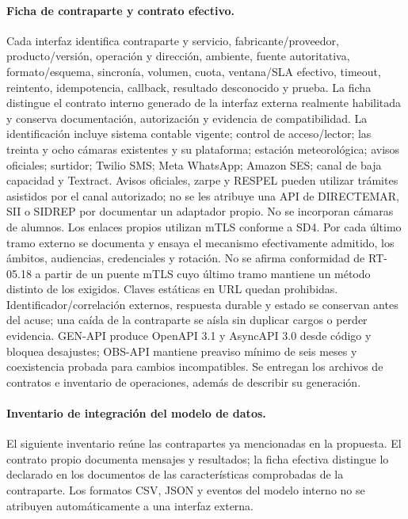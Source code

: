 \paragraph{Ficha de contraparte y contrato efectivo.}
Cada interfaz identifica contraparte y servicio, fabricante/proveedor, producto/versión, operación y dirección, ambiente, fuente autoritativa, formato/esquema, sincronía, volumen, cuota, ventana/SLA efectivo, timeout, reintento, idempotencia, callback, resultado desconocido y prueba. La ficha distingue el contrato interno generado de la interfaz externa realmente habilitada y conserva documentación, autorización y evidencia de compatibilidad.
La identificación incluye sistema contable vigente; control de acceso/lector; las treinta y ocho cámaras existentes y su plataforma; estación meteorológica; avisos oficiales; surtidor; Twilio SMS; Meta WhatsApp; Amazon SES; canal de baja capacidad y Textract. Avisos oficiales, zarpe y RESPEL pueden utilizar trámites asistidos por el canal autorizado; no se les atribuye una API de DIRECTEMAR, SII o SIDREP por documentar un adaptador propio. No se incorporan cámaras de alumnos.
Los enlaces propios utilizan mTLS conforme a SD4. Por cada último tramo externo se documenta y ensaya el mecanismo efectivamente admitido, los ámbitos, audiencias, credenciales y rotación. No se afirma conformidad de RT-05.18 a partir de un puente mTLS cuyo último tramo mantiene un método distinto de los exigidos. Claves estáticas en URL quedan prohibidas. Identificador/correlación externos, respuesta durable y estado se conservan antes del acuse; una caída de la contraparte se aísla sin duplicar cargos o perder evidencia.
GEN-API produce OpenAPI 3.1 y AsyncAPI 3.0 desde código y bloquea desajustes; OBS-API mantiene preaviso mínimo de seis meses y coexistencia probada para cambios incompatibles. Se entregan los archivos de contratos e inventario de operaciones, además de describir su generación.

\paragraph{Inventario de integración del modelo de datos.}
El siguiente inventario reúne las contrapartes ya mencionadas en la propuesta. El contrato propio documenta mensajes y resultados; la ficha efectiva distingue lo declarado en los documentos de las características comprobadas de la contraparte. Los formatos CSV, JSON y eventos del modelo interno no se atribuyen automáticamente a una interfaz externa.

